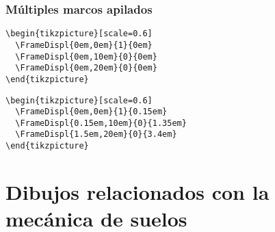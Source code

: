 \documentclass[11pt,letterpaper,oneside]{book}
\begin{document}
\subsection{Múltiples marcos apilados}

\begin{figure}[!htp]
  \centering
  \qquad

  \label{fig:rigi1}
\end{figure}

\begin{lstlisting}[firstnumber=1, title=Dibujo izquierdo]
\begin{tikzpicture}[scale=0.6]
  \FrameDispl{0em,0em}{1}{0em}
  \FrameDispl{0em,10em}{0}{0em}
  \FrameDispl{0em,20em}{0}{0em}
\end{tikzpicture}
\end{lstlisting}

\begin{lstlisting}[firstnumber=1, title=Dibujo derecho]
\begin{tikzpicture}[scale=0.6]
  \FrameDispl{0em,0em}{1}{0.15em}
  \FrameDispl{0.15em,10em}{0}{1.35em}
  \FrameDispl{1.5em,20em}{0}{3.4em}
\end{tikzpicture}
\end{lstlisting}


\chapter{Dibujos relacionados con la mecánica de suelos}

\end{document}
